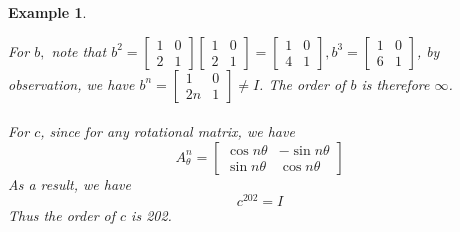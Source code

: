 \documentclass{article}
\theoremstyle{MyNonumberplain}
\theoremstyle{break}
\theoremstyle{break}
\newtheorem{example}{Example}[section]
\theoremstyle{break}
\theoremstyle{definition}
\theoremstyle{break}
\begin{document}
\begin{expbox}
\begin{example}
\begin{ansbox}
                For $b,$ note that $b^2 = \left[\begin{array}{cc}
                1 & 0\\
                2 & 1
                \end{array}\right] \left[\begin{array}{cc}
                1 & 0\\
                2 & 1
                \end{array}\right] = \left[\begin{array}{cc}
                1 & 0\\
                4 & 1
                \end{array}\right], b^3 = \left[\begin{array}{cc}
                1 & 0\\
                6 & 1
                \end{array}\right]$, by observation, we have $b^n =
                \left[\begin{array}{cc}
                1 & 0\\
                2 n & 1
                \end{array}\right] \neq I$.
                The order of $b$ is therefore $\infty$.\\\\
        
                For $c$, since for any rotational matrix, we
                have
                \[ A^n_{\theta} = \left[\begin{array}{cc}
                    \cos n \theta & - \sin n \theta\\
                    \sin n \theta & \cos n \theta
                \end{array}\right] \]
                As a result, we have
                \[ c^{202} = I \]
                Thus the order of $c$ is 202.
        
        \end{ansbox}

    \end{example}
\end{expbox}
\end{document}
